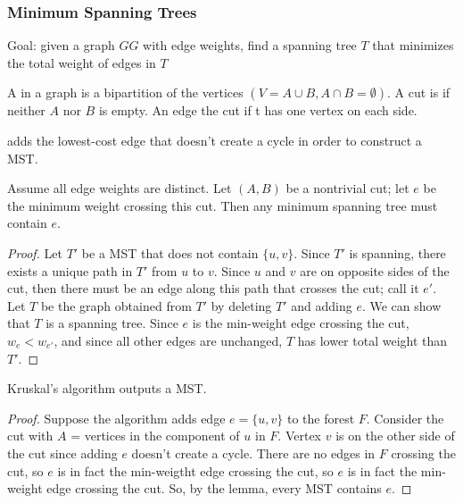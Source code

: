 \documentclass[12pt]{scrartcl}
\begin{document}
\subsubsection{Minimum Spanning Trees}

Goal: given a graph $GG$ with edge weights, find a spanning tree $T$ that minimizes the total 
weight of edges in $T$

\begin{definition}
  A  in a graph is a bipartition of the vertices $(V = A \cup B, A \cap B = \emptyset)$. 
  A cut is  if neither $A$ nor $B$ is empty. An edge  the cut 
  if t has one vertex on each side.
\end{definition}

\begin{definition}
   adds the lowest-cost edge that doesn't create a cycle in order 
  to construct a MST. 
\end{definition}

\begin{lemma}
  Assume all edge weights are distinct. Let $(A, B)$ be a nontrivial cut; let $e$ be the minimum 
  weight crossing this cut. Then any minimum spanning tree must contain $e$. 
  \begin{proof}
    Let $T'$ be a MST that does not contain $\{u, v\}$. Since $T'$ is spanning, there exists a unique path 
    in $T'$ from $u$ to $v$. Since $u$ and $v$ are on opposite sides of the cut, then there must be an edge along this path
    that crosses the cut; call it $e'$. Let $T$ be the graph obtained from $T'$ by deleting $T'$ and adding $e$. We 
    can show that $T$ is a spanning tree. Since $e$ is the min-weight edge crossing the cut, $w_e < w_{e'}$, 
    and since all other edges are unchanged, $T$ has lower total weight than $T'$. 
  \end{proof}
\end{lemma}
  
\begin{theorem}
  Kruskal's algorithm outputs a MST.
  \begin{proof}
    Suppose the algorithm adds edge $e = \{u, v\}$ to the forest $F$. Consider the cut with $A$ = vertices in the component of $u$ in $F$. 
    Vertex $v$ is on the other side of the cut since adding $e$ doesn't create a cycle. There are no edges in $F$ 
    crossing the cut, so $e$ is in fact the min-weigtht edge crossing the cut, so $e$ is in fact the 
    min-weight edge crossing the cut. So, by the lemma, every MST contains $e$. 
  \end{proof}
\end{theorem}
\end{document}
